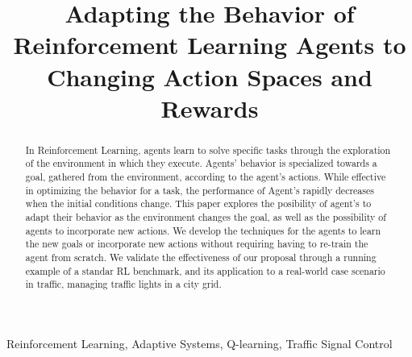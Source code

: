 \documentclass[10pt, conference, draft]{IEEEtran}
\begin{document}
\title{Adapting the Behavior of Reinforcement Learning Agents to Changing Action Spaces and Rewards}

\author{
}

\maketitle


\begin{abstract}
In Reinforcement Learning, agents learn to solve specific tasks through the 
exploration of the environment in which they execute. Agents' behavior is
specialized towards a goal, gathered from the environment, according to the 
agent's actions. While effective in optimizing the behavior for a task, the 
performance of Agent's rapidly decreases when the initial conditions change.
This paper explores the posibility of agent's to adapt their behavior as 
the environment changes the goal, as well as the possibility of agents to
incorporate new actions. We develop the techniques for the agents to 
learn the new goals or incorporate new actions without requiring having to 
re-train the agent from scratch. We validate the effectiveness of our 
proposal through a running example of a standar RL benchmark, and its 
application to a real-world case scenario in traffic, managing traffic 
lights in a city grid. 
\end{abstract}

\begin{IEEEkeywords}
Reinforcement Learning,
Adaptive Systems,
Q-learning,
Traffic Signal Control
\end{IEEEkeywords}









\printbibliography
\end{document}
